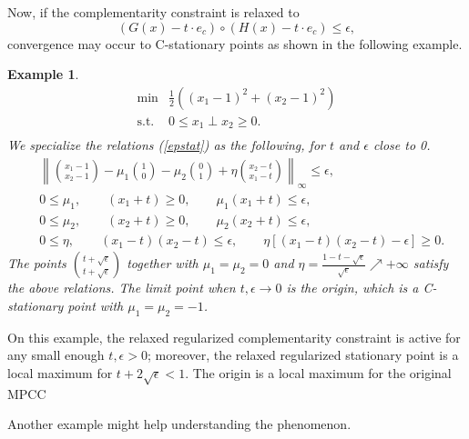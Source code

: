 \documentclass[12pt]{article}
\newtheorem{example}{Example}
\newcommand{\pref}[1]{(\ref{#1})}
\begin{document}
Now, if the complementarity constraint is relaxed to
\[(G(x)-t\cdot e_c)\circ(H(x)-t\cdot e_c)\leq \epsilon,\]
convergence may occur to C-stationary points as shown in the following example.
\begin{example}
\begin{equation}\label{MPCC_C}
 \begin{array}{ll} 
      \min &\frac12((x_1-1)^2 + (x_2-1)^2)\\
      \textrm{s.t.}
          &0\leq x_1\perp x_2\geq0.\\
 \end{array}
\end{equation}
We specialize the relations \pref{epstat} as the following, for $t$ and $\epsilon$ close to 0.
\begin{equation}\label{epstat_2}
\begin{array}{cl}
&\left\|{x_1-1\choose x_2-1}-\mu_1{1\choose0} - \mu_2{0\choose1}+\eta{x_2-t\choose x_1-t}\right\|_\infty\leq\epsilon,\\
&0\leq\mu_1, \qquad(x_1+t)\geq0, \qquad\mu_1(x_1+t)\leq\epsilon, \\
&0\leq\mu_2, \qquad(x_2+t)\geq0, \qquad\mu_2(x_2+t)\leq\epsilon, \\
&0\leq\eta,\qquad(x_1-t)(x_2-t)\leq \epsilon, \qquad\eta\left[(x_1-t)(x_2-t)-\epsilon\right]\geq0.
\end{array}
\end{equation}
The points $t+\sqrt{\epsilon}\choose t+\sqrt{\epsilon}$ together with $\mu_1=\mu_2=0$ and $\eta=\frac{1-t-\sqrt{\epsilon}}{\sqrt{\epsilon}}\nearrow+\infty$ satisfy the above relations. The limit point when $t, \epsilon\longrightarrow0$ is the origin, which is a C-stationary point with $\mu_1=\mu_2=-1$.
\end{example}
On this example, the relaxed regularized complementarity constraint is active for any small enough $t,\epsilon>0$; moreover, the relaxed regularized stationary point is a local maximum for $t+2\sqrt{\epsilon}<1$. The origin is a local maximum for the original MPCC

Another example might help understanding the phenomenon.
\end{document}
